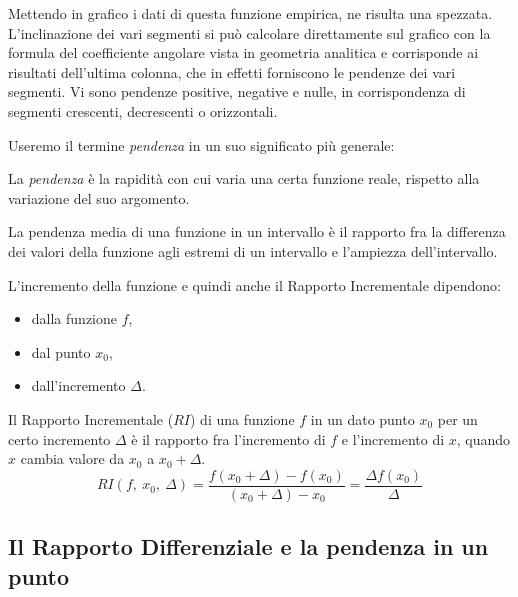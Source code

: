 \begin{esempio}
Mettendo in grafico i dati di questa funzione empirica, ne risulta una 
spezzata. 
L'inclinazione dei vari segmenti si può calcolare direttamente sul 
grafico con la formula del coefficiente angolare vista in geometria 
analitica e corrisponde ai risultati dell'ultima colonna, 
che in effetti forniscono le pendenze dei vari segmenti. 
Vi sono pendenze positive, negative e nulle, in 
corrispondenza di segmenti crescenti, decrescenti o orizzontali. 
\end{esempio}

Useremo il termine \emph{pendenza} in un suo significato più generale:
\begin{definizione}
La \emph{pendenza} è la rapidità con cui varia una certa funzione reale, 
rispetto alla variazione del suo argomento. 
\end{definizione}

La pendenza media di una funzione in un intervallo è il 
rapporto fra la differenza dei valori della funzione agli estremi di un 
intervallo e l'ampiezza dell'intervallo. 

L'incremento della funzione e quindi anche il Rapporto Incrementale 
dipendono: 
\begin{multicols}{3}
\begin{itemize} [nosep]
\item dalla funzione \(f\), 
\item dal punto \(x_0\), 
\item dall'incremento \(\Delta\).
\end{itemize}
\end{multicols}
\begin{definizione}
Il Rapporto Incrementale (\(RI\)) 
di una funzione \(f\) 
in un dato punto \(x_0\)
per un certo incremento \(\Delta\)
è il rapporto 
fra l'incremento di \(f\) e l'incremento di \(x\), quando \(x\) 
cambia valore da \(x_0\) a \(x_0+\Delta\).
\[RI(f,~x_0,~\Delta) = 
  \frac{f(x_0+\Delta)-f(x_0)}{(x_0+\Delta)- x_0}=
  \frac{\Delta f(x_0)}{\Delta}\]
\end{definizione}

\subsection{Il Rapporto Differenziale e la pendenza in un punto}
\label{subsubsec:RD}

